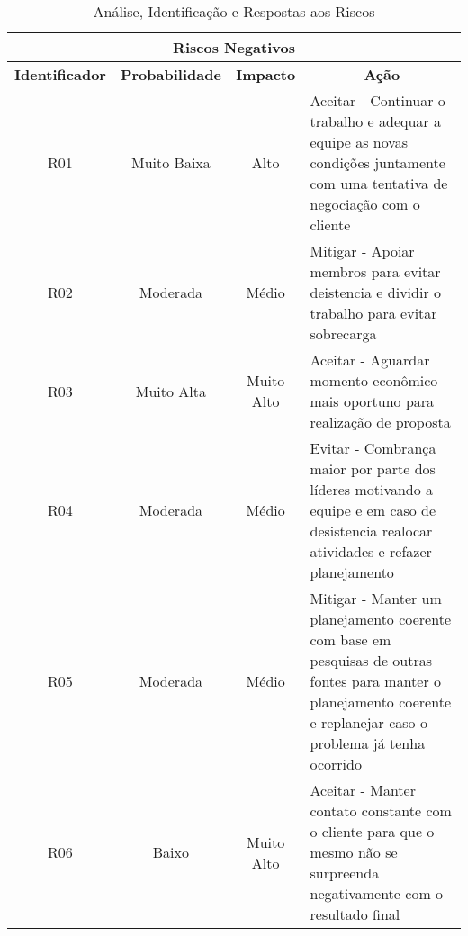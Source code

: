 \begin{table}[!h]
  \centering
  \caption{Análise, Identificação e Respostas aos Riscos}
  \begin{tabular}{|c|c|c|l|}
    \hline
    \multicolumn{4}{|c|}{\textbf{Riscos Negativos}}                                                                                                                                                                                               \\ \hline
    \textbf{Identificador} & \textbf{Probabilidade} & \textbf{Impacto} & \multicolumn{1}{c|}{\textbf{Ação}}                                                                                                                                       \\ \hline
    R01                    & Muito Baixa            & Alto             & \parbox[t]{5cm}{Aceitar - Continuar o trabalho e adequar a equipe as novas condições juntamente com uma tentativa de negociação com o cliente}                                            \\ \hline
    R02                    & Moderada               & Médio            & \parbox[t]{5cm}{Mitigar - Apoiar membros para evitar deistencia e dividir o trabalho para evitar sobrecarga}                                                                              \\ \hline
    R03                    & Muito Alta             & Muito Alto       & \parbox[t]{5cm}{Aceitar - Aguardar momento econômico mais oportuno para realização de proposta}                                                                                           \\ \hline
    R04                    & Moderada               & Médio            & \parbox[t]{5cm}{Evitar - Combrança maior por parte dos líderes motivando a equipe e em caso de desistencia realocar atividades e refazer planejamento}                                    \\ \hline
    R05                    & Moderada               & Médio            & \parbox[t]{5cm}{Mitigar - Manter um planejamento coerente com base em pesquisas de outras fontes para manter o planejamento coerente e replanejar caso o problema já tenha ocorrido}      \\ \hline
    R06                    & Baixo                  & Muito Alto       & \parbox[t]{5cm}{Aceitar - Manter contato constante com o cliente para que o mesmo não se surpreenda negativamente com o resultado final}                                                  \\ \hline

\end{tabular}
\end{table}
